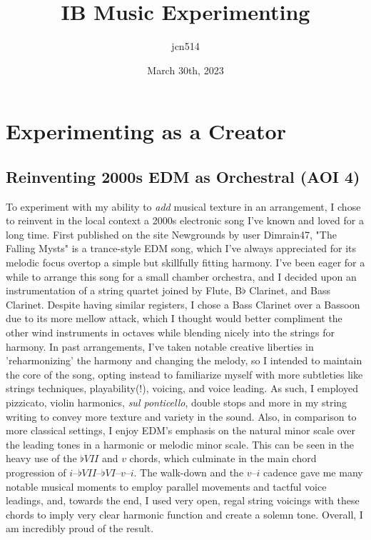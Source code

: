 \documentclass[12pt]{article}
\author{jcn514}
\title{IB Music Experimenting}
\date{March 30th, 2023}
\begin{document}
\maketitle
\tableofcontents

\pagebreak


\section{Experimenting as a Creator}


\subsection{Reinventing 2000s EDM as Orchestral (AOI 4)}

To experiment with my ability to \textit{add} musical texture in an arrangement, I chose to reinvent in the local context a 2000s electronic song I've known and loved for a long time. First published on the site Newgrounds by user Dimrain47, "The Falling Mysts" is a trance-style EDM song, which I've always appreciated for its melodic focus overtop a simple but skillfully fitting harmony. I've been eager for a while to arrange this song for a small chamber orchestra, and I decided upon an instrumentation of a string quartet joined by Flute, B$\flat$ Clarinet, and Bass Clarinet. Despite having similar registers, I chose a Bass Clarinet over a Bassoon due to its more mellow attack, which I thought would better compliment the other wind instruments in octaves while blending nicely into the strings for harmony. In past arrangements, I've taken notable creative liberties in 'reharmonizing' the harmony and changing the melody, so I intended to maintain the core of the song, opting instead to familiarize myself with more subtleties like strings techniques, playability(!), voicing, and voice leading. As such, I employed pizzicato, violin harmonics, \textit{sul ponticello}, double stops and more in my string writing to convey more texture and variety in the sound. Also, in comparison to more classical settings, I enjoy EDM's emphasis on the natural minor scale over the leading tones in a harmonic or melodic minor scale. This can be seen in the heavy use of the $\flat VII$ and $v$ chords, which culminate in the main chord progression of $i–\flat VII–\flat VI–v–i$. The walk-down and the $v–i$ cadence gave me many notable musical moments to employ parallel movements and tactful voice leadings, and, towards the end, I used very open, regal string voicings with these chords to imply very clear harmonic function and create a solemn tone. Overall, I am incredibly proud of the result.
\end{document}
